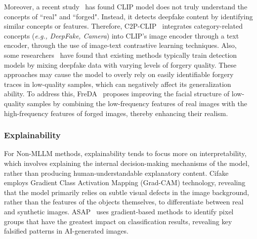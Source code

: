 Moreover, a recent study~\cite{tan2024c2p} has found CLIP model does not truly understand the concepts of ``real" and ``forged". Instead, it detects deepfake content by identifying similar concepts or features. Therefore, C2P-CLIP~\cite{tan2024c2p} integrates category-related concepts (\textit{e.g., DeepFake, Camera}) into CLIP's image encoder through a text encoder, through the use of image-text contrastive learning techniques. Also, some researchers~\cite{kim2024correlation, song2024quality} have found that existing methods typically train detection models by mixing deepfake data with varying levels of forgery quality. These approaches may cause the model to overly rely on easily identifiable forgery traces in low-quality samples, which can negatively affect its generalization ability. To address this, FreDA~\cite{song2024quality} proposes improving the facial structure of low-quality samples by combining the low-frequency features of real images with the high-frequency features of forged images, thereby enhancing their realism.

\subsubsection{\textbf{Explainability}}
For Non-MLLM methods, explainability tends to focus more on interpretability, which involves explaining the internal decision-making mechanisms of the model, rather than producing human-understandable explanatory content.
Cifake~\cite{bird2024cifake} employs Gradient Class Activation Mapping (Grad-CAM) technology, revealing that the model primarily relies on subtle visual defects in the image background, rather than the features of the objects themselves, to differentiate between real and synthetic images. ASAP~\cite{huang2024asap} uses gradient-based methods to identify pixel groups that have the greatest impact on classification results, revealing key falsified patterns in AI-generated images.

